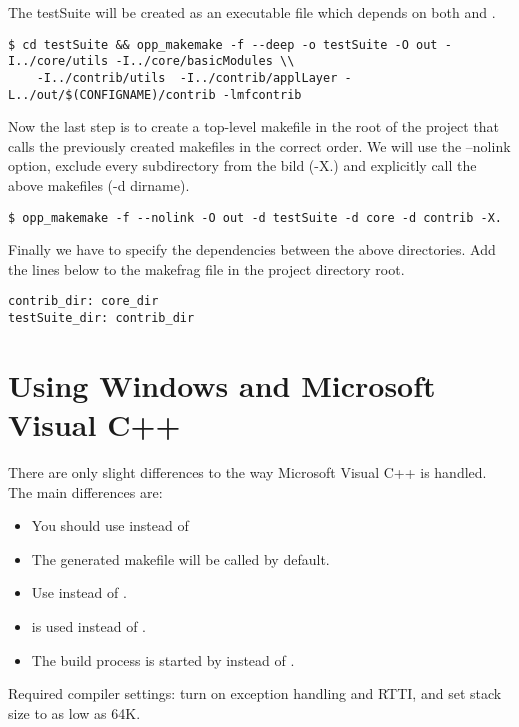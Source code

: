 The testSuite will be created as an executable file which depends on both
 and .

\begin{verbatim}
$ cd testSuite && opp_makemake -f --deep -o testSuite -O out -I../core/utils -I../core/basicModules \\
    -I../contrib/utils  -I../contrib/applLayer -L../out/$(CONFIGNAME)/contrib -lmfcontrib
\end{verbatim}

Now the last step is to create a top-level makefile in the root of the project that
calls the previously created makefiles in the correct order. We will use the
--nolink option, exclude every subdirectory from the bild (-X.) and explicitly call
the above makefiles (-d dirname).

\begin{verbatim}
$ opp_makemake -f --nolink -O out -d testSuite -d core -d contrib -X.
\end{verbatim}

Finally we have to specify the dependencies between the above directories. Add the lines below to the makefrag file
in the project directory root.

\begin{verbatim}
contrib_dir: core_dir
testSuite_dir: contrib_dir
\end{verbatim}

\ifcommercial
\section{Using Windows and Microsoft Visual C++}

There are only slight differences to the way Microsoft Visual C++
is handled. The main differences are:
\begin{itemize}
  \item{You should use  instead of }
  \item{The generated makefile will be called  by default.}
  \item{Use  instead of .}
  \item{ is used instead of .}
  \item{The build process is started by  instead of .}
\end{itemize}

Required compiler settings: turn on exception handling and RTTI, and
set stack size to as low as 64K.
\fi

